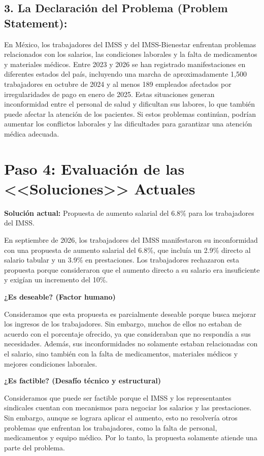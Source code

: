 \documentclass[12pt,letterpaper]{article}
\begin{document}
\subsection*{3. La Declaración del Problema (Problem Statement):}

En México, los trabajadores del IMSS y del IMSS-Bienestar enfrentan problemas relacionados con los salarios, las condiciones laborales y la falta de medicamentos y materiales médicos. Entre 2023 y 2026 se han registrado manifestaciones en diferentes estados del país, incluyendo una marcha de aproximadamente 1,500 trabajadores en octubre de 2024 y al menos 189 empleados afectados por irregularidades de pago en enero de 2025. Estas situaciones generan inconformidad entre el personal de salud y dificultan sus labores, lo que también puede afectar la atención de los pacientes. Si estos problemas continúan, podrían aumentar los conflictos laborales y las dificultades para garantizar una atención médica adecuada.

\section*{Paso 4: Evaluación de las <<Soluciones>> Actuales}

\textbf{Solución actual:} Propuesta de aumento salarial del 6.8\% para los trabajadores del IMSS.

En septiembre de 2026, los trabajadores del IMSS manifestaron su inconformidad con una propuesta de aumento salarial del 6.8\%, que incluía un 2.9\% directo al salario tabular y un 3.9\% en prestaciones. Los trabajadores rechazaron esta propuesta porque consideraron que el aumento directo a su salario era insuficiente y exigían un incremento del 10\%.

\textbf{¿Es deseable? (Factor humano)}

Consideramos que esta propuesta es parcialmente deseable porque busca mejorar los ingresos de los trabajadores. Sin embargo, muchos de ellos no estaban de acuerdo con el porcentaje ofrecido, ya que consideraban que no respondía a sus necesidades. Además, sus inconformidades no solamente estaban relacionadas con el salario, sino también con la falta de medicamentos, materiales médicos y mejores condiciones laborales.

\textbf{¿Es factible? (Desafío técnico y estructural)}

Consideramos que puede ser factible porque el IMSS y los representantes sindicales cuentan con mecanismos para negociar los salarios y las prestaciones. Sin embargo, aunque se lograra aplicar el aumento, esto no resolvería otros problemas que enfrentan los trabajadores, como la falta de personal, medicamentos y equipo médico. Por lo tanto, la propuesta solamente atiende una parte del problema.
\end{document}
